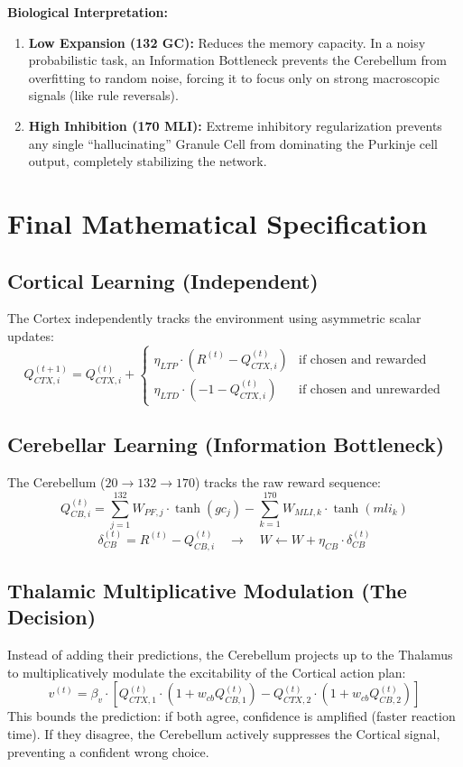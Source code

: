 \documentclass[11pt,a4paper]{article}
\begin{document}
\textbf{Biological Interpretation:}
\begin{enumerate}
    \item \textbf{Low Expansion (132 GC):} Reduces the memory capacity. In a noisy probabilistic task, an Information Bottleneck prevents the Cerebellum from overfitting to random noise, forcing it to focus only on strong macroscopic signals (like rule reversals).
    \item \textbf{High Inhibition (170 MLI):} Extreme inhibitory regularization prevents any single ``hallucinating'' Granule Cell from dominating the Purkinje cell output, completely stabilizing the network.
\end{enumerate}

\section{Final Mathematical Specification}
\subsection{Cortical Learning (Independent)}
The Cortex independently tracks the environment using asymmetric scalar updates:
\begin{equation}
Q_{CTX, i}^{(t+1)} = Q_{CTX, i}^{(t)} + \begin{cases} 
\eta_{LTP} \cdot (R^{(t)} - Q_{CTX, i}^{(t)}) & \text{if chosen and rewarded} \\
\eta_{LTD} \cdot (-1 - Q_{CTX, i}^{(t)}) & \text{if chosen and unrewarded}
\end{cases}
\end{equation}

\subsection{Cerebellar Learning (Information Bottleneck)}
The Cerebellum ($20 \rightarrow 132 \rightarrow 170$) tracks the raw reward sequence:
\begin{equation}
Q_{CB, i}^{(t)} = \sum_{j=1}^{132} W_{PF, j} \cdot \tanh(gc_j) - \sum_{k=1}^{170} W_{MLI, k} \cdot \tanh(mli_k)
\end{equation}
\begin{equation}
\delta_{CB}^{(t)} = R^{(t)} - Q_{CB, i}^{(t)} \quad \rightarrow \quad W \leftarrow W + \eta_{CB} \cdot \delta_{CB}^{(t)}
\end{equation}

\subsection{Thalamic Multiplicative Modulation (The Decision)}
Instead of adding their predictions, the Cerebellum projects up to the Thalamus to multiplicatively modulate the excitability of the Cortical action plan:
\begin{equation}
v^{(t)} = \beta_v \cdot \left[ Q_{CTX, 1}^{(t)} \cdot (1 + w_{cb} Q_{CB, 1}^{(t)}) - Q_{CTX, 2}^{(t)} \cdot (1 + w_{cb} Q_{CB, 2}^{(t)}) \right]
\end{equation}
This bounds the prediction: if both agree, confidence is amplified (faster reaction time). If they disagree, the Cerebellum actively suppresses the Cortical signal, preventing a confident wrong choice.
\end{document}

